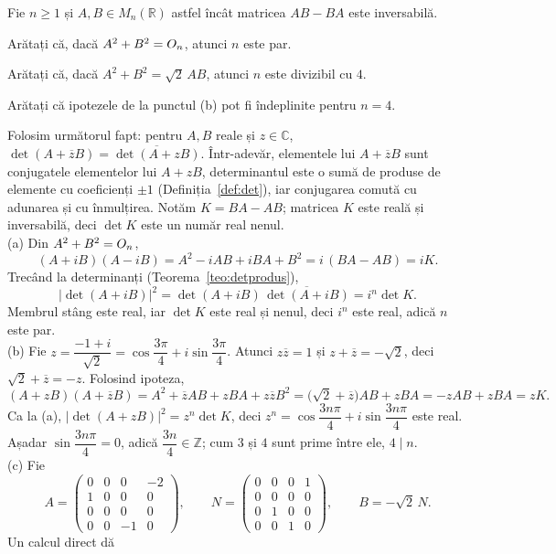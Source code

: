 Fie $n\ge1$ și $A,B\in M_n(\mathbb{R})$ astfel încât matricea $AB-BA$ este inversabilă.
\begin{parti}
  \item Arătați că, dacă $A^2+B^2=O_n$, atunci $n$ este par.
  \item Arătați că, dacă $A^2+B^2=\sqrt2\,AB$, atunci $n$ este divizibil cu $4$.
  \item Arătați că ipotezele de la punctul (b) pot fi îndeplinite pentru $n=4$.
\end{parti}
\sol Folosim următorul fapt: pentru $A,B$ reale și $z\in\mathbb{C}$, $\det(A+\overline{z}B)=\overline{\det(A+zB)}$. Într-adevăr, elementele lui $A+\overline{z}B$ sunt conjugatele elementelor lui $A+zB$, determinantul este o sumă de produse de elemente cu coeficienți $\pm1$ (Definiția~\ref{def:det}), iar conjugarea comută cu adunarea și cu înmulțirea. Notăm $K=BA-AB$; matricea $K$ este reală și inversabilă, deci $\det K$ este un număr real nenul.\\[2pt]
(a) Din $A^2+B^2=O_n$,
\[ (A+iB)(A-iB)=A^2-iAB+iBA+B^2=i\,(BA-AB)=iK. \]
Trecând la determinanți (Teorema~\ref{teo:detprodus}),
\[ \bigl|\det(A+iB)\bigr|^2=\det(A+iB)\,\overline{\det(A+iB)}=i^n\det K. \]
Membrul stâng este real, iar $\det K$ este real și nenul, deci $i^n$ este real, adică $n$ este par.\\[2pt]
(b) Fie $z=\dfrac{-1+i}{\sqrt2}=\cos\dfrac{3\pi}{4}+i\sin\dfrac{3\pi}{4}$. Atunci $z\overline{z}=1$ și $z+\overline{z}=-\sqrt2$, deci $\sqrt2+\overline{z}=-z$. Folosind ipoteza,
\[ (A+zB)(A+\overline{z}B)=A^2+\overline{z}AB+zBA+z\overline{z}B^2=\bigl(\sqrt2+\overline{z}\bigr)AB+zBA=-zAB+zBA=zK. \]
Ca la (a), $\bigl|\det(A+zB)\bigr|^2=z^n\det K$, deci $z^n=\cos\dfrac{3n\pi}{4}+i\sin\dfrac{3n\pi}{4}$ este real. Așadar $\sin\dfrac{3n\pi}{4}=0$, adică $\dfrac{3n}{4}\in\mathbb{Z}$; cum $3$ și $4$ sunt prime între ele, $4\mid n$.\\[2pt]
(c) Fie
\[ A=\begin{pmatrix}0&0&0&-2\\1&0&0&0\\0&0&0&0\\0&0&-1&0\end{pmatrix},\qquad N=\begin{pmatrix}0&0&0&1\\0&0&0&0\\0&1&0&0\\0&0&1&0\end{pmatrix},\qquad B=-\sqrt2\,N. \]
Un calcul direct dă
